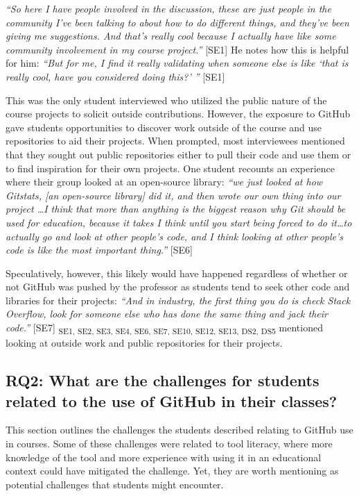 \textit{``So here I have people involved in the discussion, these are just people in the community I've been talking to about how to do different things, and they've been giving me suggestions. And that's really cool because I actually have like some community involvement in my course project.''} [SE1] He notes how this is helpful for him: \textit{``But for me, I find it really validating when someone else is like `that is really cool, have you considered doing this?' ''} [SE1]

This was the only student interviewed who utilized the public nature of the course projects to solicit outside contributions. However, the exposure to GitHub gave students opportunities to discover work outside of the course and use repositories to aid their projects. When prompted, most interviewees mentioned that they sought out public repositories either to pull their code and use them or to find inspiration for their own projects. One student recounts an experience where their group looked at an open-source library: \textit{``we just looked at how Gitstats, [an open-source library] did it, and then wrote our own thing into our project \ldots I think that more than anything is the biggest reason why Git should be used for education, because it takes I think until you start being forced to do it\ldots to actually go and look at other people's code, and I think looking at other people's code is like the most important thing.''} [SE6]

Speculatively, however, this likely would have happened regardless of whether or not GitHub was pushed by the professor as students tend to seek other code and libraries for their projects: \textit{``And in industry, the first thing you do is check Stack Overflow, look for someone else who has done the same thing and jack their code.''} [SE7] \textsubscript{SE1, SE2, SE3, SE4, SE6, SE7, SE10, SE12, SE13, DS2, DS5} mentioned looking at outside work and public repositories for their projects.

\subsection{RQ2: What are the challenges for students related to the use of GitHub in their classes?}
This section outlines the challenges the students described relating to GitHub use in courses. Some of these challenges were related to tool literacy, where more knowledge of the tool and more experience with using it in an educational context could have mitigated the challenge. Yet, they are worth mentioning as potential challenges that students might encounter. \\

